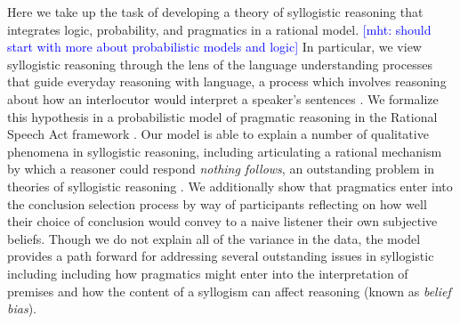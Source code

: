 \documentclass[floatsintext, doc]{apa6}
\newcommand{\mht}[1]{{\textcolor{Blue}{[mht: #1]}}}
\begin{document}

Here we take up the task of developing a theory of syllogistic reasoning that integrates logic, probability, and pragmatics in a rational model.
\mht{should start with more about probabilistic models and logic}
In particular, we view syllogistic reasoning through the lens of the language understanding processes that guide everyday reasoning with language, a process which involves reasoning about how an interlocutor would interpret a speaker's sentences \cite{Grice1975, Clark1996, Levinson2000}. 
We formalize this hypothesis in a probabilistic model of pragmatic reasoning in the Rational Speech Act framework \cite{Frank2012a, goodman2016pragmatic}.
Our model is able to explain a number of qualitative phenomena in syllogistic reasoning, including articulating a rational mechanism by which a reasoner could respond \emph{nothing follows}, an outstanding problem in theories of syllogistic reasoning \cite{riesterer2020modeling}.
We additionally show that pragmatics enter into the conclusion selection process by way of participants reflecting on how well their choice of conclusion would convey to a naive listener their own subjective beliefs. 
Though we do not explain all of the variance in the data, the model provides a path forward for addressing several outstanding issues in syllogistic including including how pragmatics might enter into the interpretation of premises and  how the content of a syllogism can affect reasoning (known as \emph{belief bias}).
\end{document}
